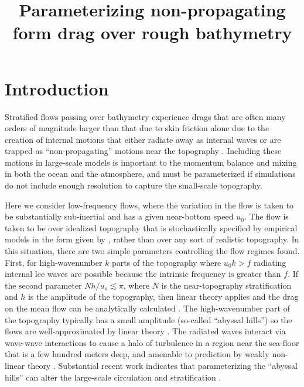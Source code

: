 \documentclass[twocol]{ametsocV5}
\title{Parameterizing non-propagating form drag over rough bathymetry}
\affiliation{University of Victoria, Victoria, BC, Canada}
\begin{document}
\maketitle

\section{Introduction}

Stratified flows passing over bathymetry experience drags that are often many orders of magnitude larger than that due to skin friction alone due to the creation of internal motions that either radiate away as internal waves \citep{bell75a} or are trapped as ``non-propagating'' motions near the topography \citep[i.e.][]{bacmeisterpierrhumbert88}.  Including these motions in large-scale models is important to the momentum balance and mixing in both the ocean and the atmosphere, and must be parameterized if simulations do not include enough resolution to capture the small-scale topography.  

Here we consider low-frequency flows, where the variation in the flow is taken to be substantially sub-inertial and has a given near-bottom speed $u_0$.    The flow is taken to be over idealized topography that is stochastically specified by empirical models in the form given by \citet{goffarbic10}, rather than over any sort of realistic topography.    In this situation, there are two simple parameters controlling the flow regimes found.  First, for high-wavenumber $k$ parts of the topography where $u_0k > f$ radiating internal lee waves are possible because the intrinsic frequency is greater than $f$.  If the second parameter $Nh/u_o \lesssim \pi$, where $N$ is the near-topography stratification and $h$ is the amplitude of the topography, then linear theory applies and the drag on the mean flow can be analytically calculated \citep{bell75a}.  The high-wavenumber part of the topography typically has a small amplitude (so-called ``abyssal hills'') so the flows are well-approximated by linear theory \citep{nikurashinferrari10a,nikurashinferrari14}.  The radiated waves interact via wave-wave interactions to cause a halo of turbulence in a region near the sea-floor that is a few hundred meters deep, and amenable to prediction by weakly non-linear theory \citep{polzin09}.  Substantial recent work indicates that parameterizing the ``abyssal hills'' can alter the large-scale circulation and stratification \citep[i.e.]{meletetal13, de_Lavergne_2017}.  
\end{document}
